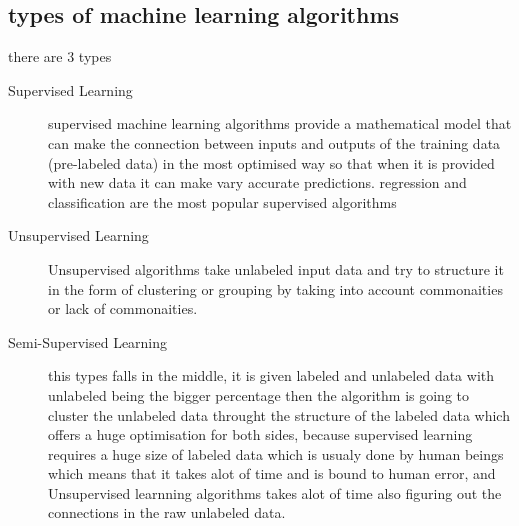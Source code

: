     \subsection{types of machine learning algorithms}
        there are 3 types ~\cite{ml}
        \begin{description}
        \item[Supervised Learning]
            supervised machine learning algorithms provide a mathematical model that can make the connection between inputs and outputs of the training data (pre-labeled data) in the most optimised way so that when it is provided with new data it can make vary accurate predictions. regression and classification are the most popular supervised algorithms 
        \item[Unsupervised Learning]
            Unsupervised algorithms take unlabeled input data and try to structure it in the form of clustering or grouping by taking into account commonaities or lack of commonaities.
        \item[Semi-Supervised Learning]
            this types falls in the middle, it is given labeled and unlabeled data with unlabeled being the bigger percentage then the algorithm is going to cluster the unlabeled data throught the structure of the labeled data which offers a huge optimisation for both sides, because supervised learning requires a huge size of labeled data which is usualy done by human beings which means that it takes alot of time and is bound to human error, and Unsupervised learnning algorithms takes alot of time also figuring out the connections in the raw unlabeled data.
        \end{description}

